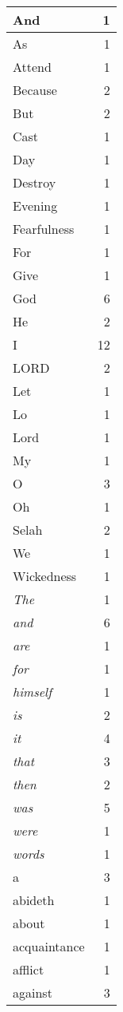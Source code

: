 \begin{center}
\begin{longtable}{l|r}
\hline \hline
\endlastfoot
And & 1 \\ \hline
As & 1 \\ \hline
Attend & 1 \\ \hline
Because & 2 \\ \hline
But & 2 \\ \hline
Cast & 1 \\ \hline
Day & 1 \\ \hline
Destroy & 1 \\ \hline
Evening & 1 \\ \hline
Fearfulness & 1 \\ \hline
For & 1 \\ \hline
Give & 1 \\ \hline
God & 6 \\ \hline
He & 2 \\ \hline
I & 12 \\ \hline
LORD & 2 \\ \hline
Let & 1 \\ \hline
Lo & 1 \\ \hline
Lord & 1 \\ \hline
My & 1 \\ \hline
O & 3 \\ \hline
Oh & 1 \\ \hline
Selah & 2 \\ \hline
We & 1 \\ \hline
Wickedness & 1 \\ \hline
\emph{The} & 1 \\ \hline
\emph{and} & 6 \\ \hline
\emph{are} & 1 \\ \hline
\emph{for} & 1 \\ \hline
\emph{himself} & 1 \\ \hline
\emph{is} & 2 \\ \hline
\emph{it} & 4 \\ \hline
\emph{that} & 3 \\ \hline
\emph{then} & 2 \\ \hline
\emph{was} & 5 \\ \hline
\emph{were} & 1 \\ \hline
\emph{words} & 1 \\ \hline
a & 3 \\ \hline
abideth & 1 \\ \hline
about & 1 \\ \hline
acquaintance & 1 \\ \hline
afflict & 1 \\ \hline
against & 3 \\ \hline

\end{longtable}
\end{center}

